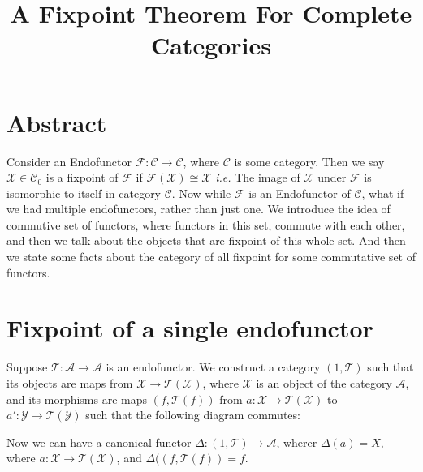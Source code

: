 \documentclass[12pt]{article}
\title{A Fixpoint Theorem For Complete Categories}
\begin{document}
\maketitle
\section*{Abstract}
Consider an Endofunctor $\mathcal F: \mathcal C \to \mathcal C$, where $\mathcal C$ is some category. Then we say $\mathcal X \in \mathcal C_0$ is a fixpoint of $\mathcal F$ if $\mathcal F (\mathcal X) \cong \mathcal X$ \textit{i.e.} The image of $\mathcal X$ under $\mathcal F$ is isomorphic to itself in category $\mathcal C$. Now while $\mathcal F$ is an Endofunctor of $\mathcal C$, what if we had multiple endofunctors, rather than just one. We introduce the idea of commutive set of functors, where functors in this set, commute with each other, and then we talk about the objects that are fixpoint of this whole set. And then we state some facts about the category of all fixpoint for some commutative set of functors.


\section*{Fixpoint of a single endofunctor}
Suppose $\mathcal T: \mathcal A \to \mathcal A$ is an endofunctor. We construct a category $(1, \mathcal T)$ such that its objects are maps from $\mathcal X \to \mathcal T( \mathcal X)$, where $\mathcal X$ is an object of the category $\mathcal A$, and its morphisms are maps $(f, \mathcal T(f))$ from $a: \mathcal X \to \mathcal T(\mathcal X)$ to $a': \mathcal Y \to \mathcal T (\mathcal Y)$ such that the following diagram commutes:
\begin{center}
\end{center}
Now we can have a canonical functor $\Delta : (1, \mathcal T) \to \mathcal A$, wherer $\Delta(a) = X$, where $a: \mathcal X \to \mathcal T(\mathcal X)$, and $\Delta ((f, \mathcal T(f)) = f$. 
\end{document}
